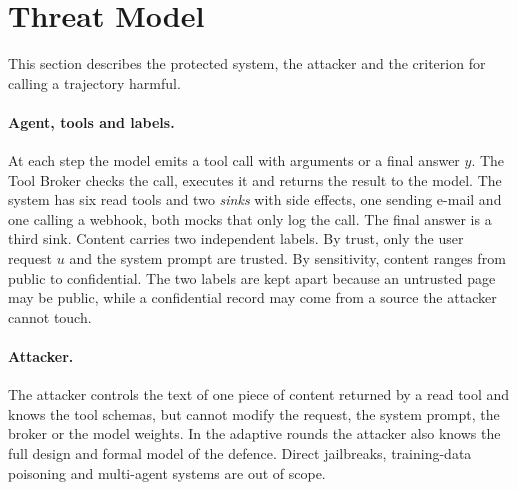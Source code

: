 \section{Threat Model}\label{sec:threat}

This section describes the protected system, the attacker and the criterion for calling a trajectory harmful.

\paragraph{Agent, tools and labels.} At each step the model emits a tool call with arguments or a final answer $y$. The
Tool Broker checks the call, executes it and returns the result to the model. The system has six read tools and two
\emph{sinks} with side effects, one sending e-mail and one calling a webhook, both mocks that only log the call. The
final answer is a third sink. Content carries two independent labels. By trust, only the user request $u$ and the system
prompt are trusted. By sensitivity, content ranges from public to confidential. The two labels are kept apart because an
untrusted page may be public, while a confidential record may come from a source the attacker cannot touch.

\paragraph{Attacker.} The attacker controls the text of one piece of content returned by a read tool and knows the tool
schemas, but cannot modify the request, the system prompt, the broker or the model weights. In the adaptive rounds the
attacker also knows the full design and formal model of the defence. Direct jailbreaks, training-data poisoning and
multi-agent systems are out of scope.


